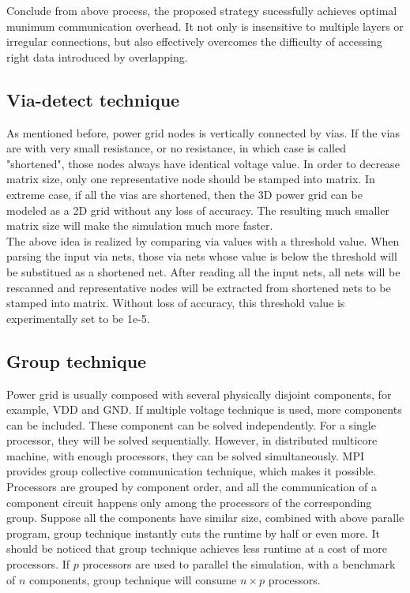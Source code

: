 \documentclass{sig-alternate}
\begin{document}
	Conclude from above process, the proposed strategy sucessfully achieves optimal munimum communication overhead. It  
	not only is insensitive to multiple layers or irregular connections, but also effectively overcomes the difficulty of 
	accessing right data introduced by overlapping.\\
	
  \subsection{Via-detect technique}
	As mentioned before, power grid nodes is vertically connected by vias. If the vias are with very small resistance, or no 
	resistance, in which case is called "shortened", those nodes always have identical voltage value. In order to decrease matrix
	size, only one representative node should be stamped into matrix. In extreme case, if all the
	vias are shortened, then the 3D power grid can be modeled as a 2D grid without any loss of accuracy. The resulting much smaller 
	matrix size will make the simulation much more faster.\\ 
 
	The above idea is realized by comparing via values with a threshold value. When parsing the input
	via nets, those via nets whose value is below the threshold will be substitued as a shortened net. After reading all the 
	input nets, all nets will be rescanned and representative nodes will be extracted from shortened nets to be stamped into matrix. 
	Without loss of accuracy, this threshold value is experimentally set to be 1e-5.\\
 
  \subsection{Group technique} 
	Power grid is usually composed with several physically disjoint components, for example,
	VDD and GND. If multiple voltage technique is used, more components can be included. These component can be solved independently. 
	For a single processor, they will be solved sequentially. However, in distributed multicore machine, 
	with enough processors, they can be solved simultaneously. MPI provides group collective communication technique, which makes 
	it possible. Processors are grouped by component order, and all the communication of a component circuit happens only among 
	the processors of the corresponding group. Suppose all the components have similar size, combined with above paralle program, 
	group technique instantly cuts the runtime by half or even more. It should be noticed that group technique achieves less runtime
	at a cost of more processors. If $p$ processors are used to parallel the simulation, with a benchmark of $n$ components, group 
	technique will consume $n\times p$ processors. \\ 
 
\end{document}
